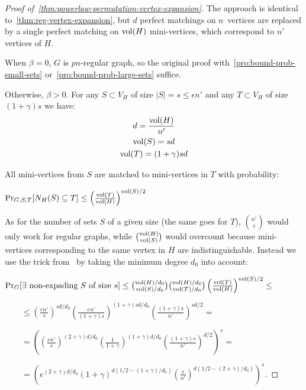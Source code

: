 \begin{proof}[Proof of~\autoref{thm:powerlaw-permutation-vertex-expansion}]
    \label{prf:powerlaw-permutation-vertex-expansion}
    The approach is identical to~\autoref{thm:reg-vertex-expansion},
    but $d$ perfect matchings on $n$~vertices
    are replaced by a single perfect matching on $\operatorname*{vol}(H)$ mini-vertices,
    which correspond to $n'$ vertices of $H$.
    
    When $\beta=0$, $G$ is $pn$-regular graph, so the original proof
    with~\autoref{pro:bound-prob-small-sets}
    or~\autoref{pro:bound-prob-large-sets} suffice.
    
    Otherwise, $\beta>0$.
    For any $S\subset V_H$ of size $|S|=s\leq\epsilon n'$
    and any $T\subset V_H$ of size $(1+\gamma)s$ we have:
    \begin{gather}
        d=\frac{\operatorname*{vol}(H)}{n'}\\
        \operatorname*{vol}(S)=sd\\
        \operatorname*{vol}(T)=(1+\gamma)sd
    \end{gather}
    
    All mini-vertices from $S$ are matched to mini-vertices in $T$ with probability:
    
    $\Pr_{G,S,T}[N_H(S)\subseteq T]\leq\left(\frac{\operatorname*{vol}(T)}{\operatorname*{vol}(H)}\right)^{\operatorname*{vol}(S)/2}$
    
    As for the number of sets $S$ of a given size (the same goes for $T$),
    $\binom{n'}{s}$ would only work for regular graphs,
    while $\binom{\operatorname*{vol}(H)}{\operatorname*{vol}(S)}$ would overcount because mini-vertices
    corresponding to the same vertex in $H$ are indistinguishable.
    Instead we use the trick from~\cite{gms03} by taking
    the minimum degree $d_0$ into account:
    
    $\Pr_G[\exists\text{ non-expading }S\text{ of size }s]
    \leq\binom{\operatorname*{vol}(H)/d_0}{\operatorname*{vol}(S)/d_0}
    \binom{\operatorname*{vol}(H)/d_0}{\operatorname*{vol}(T)/d_0}
    \left(\frac{\operatorname*{vol}(T)}{\operatorname*{vol}(H)}\right)^{\operatorname*{vol}(S)/2}\leq$
    
    $\qquad\leq\left(\frac{en'}{s}\right)^{sd/d_0}
    \left(\frac{en'}{(1+\gamma)s}\right)^{(1+\gamma)sd/d_0}
    \left(\frac{(1+\gamma)s}{n'}\right)^{sd/2}=$
    
    $\qquad=\left(
        \left(\frac{en'}{s}\right)^{(2+\gamma)d/d_0}
        \left(\frac{1}{1+\gamma}\right)^{(1+\gamma)d/d_0}
        \left(\frac{(1+\gamma)s}{n'}\right)^{d/2}
    \right)^s=$
    
    $\qquad=\left(
        e^{(2+\gamma)d/d_0}
        (1+\gamma)^{d(1/2-(1+\gamma)/d_0)}
        \left(\frac{s}{n'}\right)^{d(1/2-(2+\gamma)/d_0)}
    \right)^s$.
    

\end{proof}
